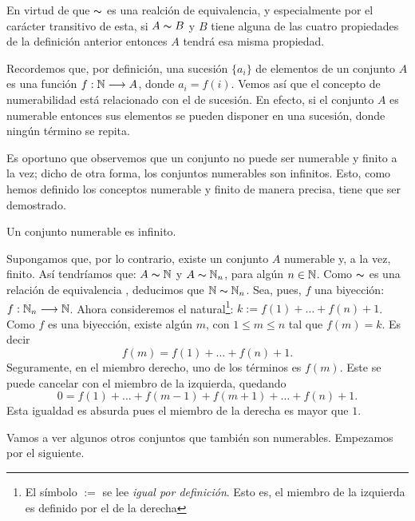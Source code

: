 En virtud de que $\thicksim$ es una realción de equivalencia, y
especialmente por el carácter transitivo de esta, si $A\thicksim
B$ y $B$ tiene alguna de las cuatro propiedades de la definición
anterior entonces $A$ tendrá esa misma propiedad.

Recordemos que, por definición, una sucesión $\{a_i\}$ de
elementos de un conjunto $A$ es una función
$f:\mathbb{N}\longrightarrow A$, donde $a_i=f(i)$. Vemos así que el
concepto de numerabilidad está relacionado con el de sucesión.
En efecto, si el conjunto $A$ es numerable entonces sus elementos
se pueden disponer en una sucesión, donde ningún término se
repita.

Es oportuno que observemos que un conjunto no puede ser numerable
y finito a la vez; dicho de otra forma, los conjuntos numerables
son infinitos. Esto, como hemos definido los conceptos numerable y
finito de  manera precisa, tiene que ser demostrado.

\begin{teorema}\label{nesinfinito} Un conjunto numerable es
infinito.
\end{teorema}
\begin{demo} Supongamos que, por lo contrario, existe un conjunto
$A$ numerable y, a la vez, finito. Así tendríamos que:
$A\thicksim\mathbb{N}$ y $A\thicksim\mathbb{N}_n$, para algún $n\in\mathbb{N}$. Como
$\thicksim$ es una relación de equivalencia , deducimos que
$\mathbb{N}\thicksim\mathbb{N}_n$. Sea, pues, $f$ una biyección:
$f:\mathbb{N}_n\longrightarrow\mathbb{N}$. Ahora consideremos el
natural\footnote{El símbolo $:=$ se lee \emph{igual por
definición}. Esto es, el miembro de la izquierda es definido por
el de la derecha}: $k:=f(1)+\dots+f(n)+1$. Como $f$ es una
biyección, existe algún $m$, con $1\leq m\leq n$ tal que
$f(m)=k$. Es decir
\[f(m)=f(1)+\dots+f(n)+1.\]
Seguramente, en el miembro derecho, uno de los términos es
$f(m)$. Este se puede cancelar con el miembro de la izquierda,
quedando
\[0=f(1)+\dots+f(m-1)+f(m+1)+\dots+f(n)+1.\]
Esta igualdad es absurda pues el miembro de la derecha es mayor
que $1$.
\end{demo}

Vamos a ver algunos otros conjuntos que también son numerables.
Empezamos por el siguiente.

